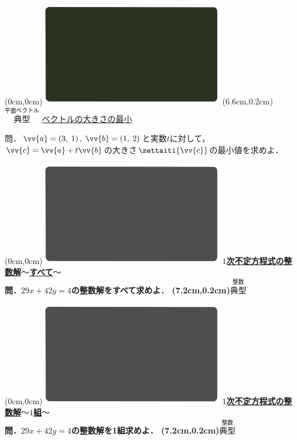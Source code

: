 \documentclass[10pt,
fleqn,
dvipdfmx,
uplatex
]{jsarticle}
\begin{document}
\newpage



\at(0cm,0cm){\includegraphics[width=8cm,bb=0 0 1920 1080]{./youtube/thumbnails/templates/smart_background/平面ベクトル.jpeg}}
\at(6.6cm,0.2cm){\small\color{bradorange}$\overset{\text{平面ベクトル}}{\text{典型}}$}
{\color{orange}\LARGE\underline{ベクトルの大きさの最小}}\vspace{0.3zw}

\Large 
問．$\vv {a}=\left(3,\;1\right),\;\vv {b}=\left(1,\;2\right)$と実数$t$に対して，$\vv {c}=\vv {a}+t\vv {b}$の大きさ$\zettaiti{\vv {c}}$の最小値を求めよ．


\newpage

\at(0cm,0cm){\includegraphics[width=8cm,bb=0 0 1920 1080]{./youtube/thumbnails/templates/smart_background/整数.jpeg}}
{\color{orange}\bf\boldmath\large\underline{$1$次不定方程式の整数解$〜$すべて$〜$}}\vspace{0.3zw}\\
\huge 
\bf\boldmath 問．${29}x+{42}y=4$の整数解をすべて求めよ．
\at(7.2cm,0.2cm){\small\color{bradorange}$\overset{\text{整数}}{\text{典型}}$}

\newpage

\at(0cm,0cm){\includegraphics[width=8cm,bb=0 0 1920 1080]{./youtube/thumbnails/templates/smart_background/整数.jpeg}}
{\color{orange}\bf\boldmath\large\underline{$1$次不定方程式の整数解$〜1$組$〜$}}\vspace{0.3zw}\\
\huge 
\bf\boldmath 問．${29}x+{42}y=4$の整数解を1組求めよ．
\at(7.2cm,0.2cm){\small\color{bradorange}$\overset{\text{整数}}{\text{典型}}$}
\end{document}
